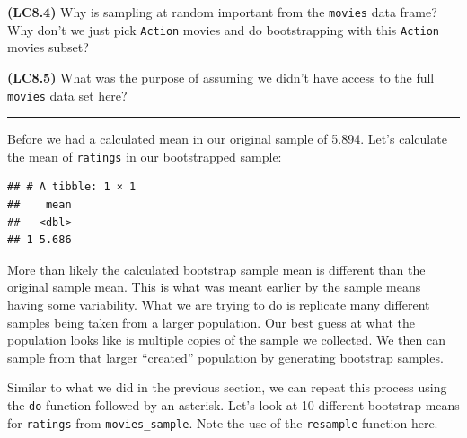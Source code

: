\documentclass[]{tufte-book}
\newenvironment{Shaded}{\begin{snugshade}}{\end{snugshade}}
\newcommand{\KeywordTok}[1]{\textcolor[rgb]{0.13,0.29,0.53}{\textbf{{#1}}}}
\newcommand{\DataTypeTok}[1]{\textcolor[rgb]{0.13,0.29,0.53}{{#1}}}
\newcommand{\DecValTok}[1]{\textcolor[rgb]{0.00,0.00,0.81}{{#1}}}
\newcommand{\StringTok}[1]{\textcolor[rgb]{0.31,0.60,0.02}{{#1}}}
\newcommand{\NormalTok}[1]{{#1}}
\let\oldrule=\rule
\renewcommand{\rule}[1]{\oldrule{\linewidth}}
\theoremstyle{definition}
\theoremstyle{definition}
\theoremstyle{remark}
\begin{document}
\textbf{(LC8.4)} Why is sampling at random important from the
\texttt{movies} data frame? Why don't we just pick \texttt{Action}
movies and do bootstrapping with this \texttt{Action} movies subset?

\textbf{(LC8.5)} What was the purpose of assuming we didn't have access
to the full \texttt{movies} data set here?

\begin{center}\rule{0.5\linewidth}{\linethickness}\end{center}

Before we had a calculated mean in our original sample of 5.894. Let's
calculate the mean of \texttt{ratings} in our bootstrapped sample:

\begin{Shaded}
\end{Shaded}

\begin{verbatim}
## # A tibble: 1 × 1
##    mean
##   <dbl>
## 1 5.686
\end{verbatim}

More than likely the calculated bootstrap sample mean is different than
the original sample mean. This is what was meant earlier by the sample
means having some variability. What we are trying to do is replicate
many different samples being taken from a larger population. Our best
guess at what the population looks like is multiple copies of the sample
we collected. We then can sample from that larger ``created'' population
by generating bootstrap samples.

Similar to what we did in the previous section, we can repeat this
process using the \texttt{do} function followed by an asterisk. Let's
look at 10 different bootstrap means for \texttt{ratings} from
\texttt{movies\_sample}. Note the use of the \texttt{resample} function
here.

\begin{Shaded}
\end{Shaded}
\end{document}
